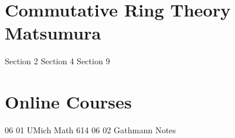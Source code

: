 \documentclass{article}
\begin{document}
\newpage\part{Commutative Ring Theory Matsumura}
{Section 2}
{Section 4}
{Section 9}

\newpage\part{Online Courses}
{06 01 UMich Math 614}
{06 02 Gathmann Notes}

\newpage

\end{document}
